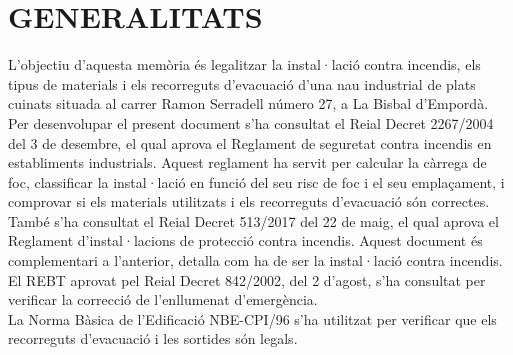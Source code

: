 \chapter{\uppercase{Generalitats}}
L'objectiu d'aquesta memòria és legalitzar la instal·lació contra incendis, els tipus de materials i els recorreguts d'evacuació d'una nau industrial de plats cuinats situada al carrer Ramon Serradell número 27, a La Bisbal d'Empordà. \\
\newline Per desenvolupar el present document s'ha consultat el Reial Decret 2267/2004 del 3 de desembre, el qual aprova el Reglament de seguretat contra incendis en establiments industrials. Aquest reglament ha servit per calcular la càrrega de foc, classificar la instal·lació en funció del seu risc de foc i el seu emplaçament, i comprovar si els materials utilitzats i els recorreguts d'evacuació són correctes.\\
\newline També s'ha consultat el Reial Decret 513/2017 del 22 de maig, el qual aprova el Reglament d'instal·lacions de protecció contra incendis. Aquest document és complementari a l'anterior, detalla com ha de ser la instal·lació contra incendis.\\
\newline El REBT aprovat pel Reial Decret 842/2002, del 2 d'agost, s'ha consultat per verificar la correcció de l'enllumenat d'emergència.\\
\newline La Norma Bàsica de l'Edificació NBE-CPI/96 s'ha utilitzat per verificar que els recorreguts d'evacuació i les sortides són legals.

\clearpage